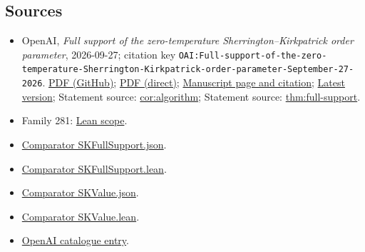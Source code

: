 \documentclass[11pt]{article}
\begin{document}
\subsection{Sources}
\begin{itemize}
\item OpenAI, \emph{Full support of the zero-temperature Sherrington–Kirkpatrick order parameter}, 2026-09-27; citation key \texttt{OAI:Full-support-of-the-zero-temperature-Sherrington-Kirkpatrick-order-parameter-September-27-2026}. \href{https://github.com/openai/math/blob/adc7f1241b42e322a6451854ab7e4b4c146bf78a/preprints/Full-support-of-the-zero-temperature-Sherrington-Kirkpatrick-order-parameter-September-27-2026/main.pdf}{PDF (GitHub)}; \href{https://github.com/openai/math/raw/adc7f1241b42e322a6451854ab7e4b4c146bf78a/preprints/Full-support-of-the-zero-temperature-Sherrington-Kirkpatrick-order-parameter-September-27-2026/main.pdf}{PDF (direct)}; \href{https://github.com/openai/math/blob/adc7f1241b42e322a6451854ab7e4b4c146bf78a/preprints/Full-support-of-the-zero-temperature-Sherrington-Kirkpatrick-order-parameter-September-27-2026/README.md}{Manuscript page and citation}; \href{https://github.com/openai/math/blob/main/preprints/Full-support-of-the-zero-temperature-Sherrington-Kirkpatrick-order-parameter-September-27-2026/main.pdf}{Latest version}; Statement source: \href{https://github.com/openai/math/blob/adc7f1241b42e322a6451854ab7e4b4c146bf78a/preprints/Full-support-of-the-zero-temperature-Sherrington-Kirkpatrick-order-parameter-September-27-2026/build/algorithm-application.tex\#L13}{cor:algorithm}; Statement source: \href{https://github.com/openai/math/blob/adc7f1241b42e322a6451854ab7e4b4c146bf78a/preprints/Full-support-of-the-zero-temperature-Sherrington-Kirkpatrick-order-parameter-September-27-2026/build/main.tex\#L119}{thm:full-support}.
\item Family 281: \href{https://github.com/openai/math/blob/adc7f1241b42e322a6451854ab7e4b4c146bf78a/lean/docs/281.md}{Lean scope}.
\item \href{https://github.com/openai/math/blob/adc7f1241b42e322a6451854ab7e4b4c146bf78a/lean/ComparatorChallenges/SKFullSupport.json}{Comparator SKFullSupport.json}.
\item \href{https://github.com/openai/math/blob/adc7f1241b42e322a6451854ab7e4b4c146bf78a/lean/ComparatorChallenges/SKFullSupport.lean}{Comparator SKFullSupport.lean}.
\item \href{https://github.com/openai/math/blob/adc7f1241b42e322a6451854ab7e4b4c146bf78a/lean/ComparatorChallenges/SKValue.json}{Comparator SKValue.json}.
\item \href{https://github.com/openai/math/blob/adc7f1241b42e322a6451854ab7e4b4c146bf78a/lean/ComparatorChallenges/SKValue.lean}{Comparator SKValue.lean}.
\item \href{https://github.com/openai/math/blob/adc7f1241b42e322a6451854ab7e4b4c146bf78a/CONTENTS.md}{OpenAI catalogue entry}.
\end{itemize}
\end{document}
